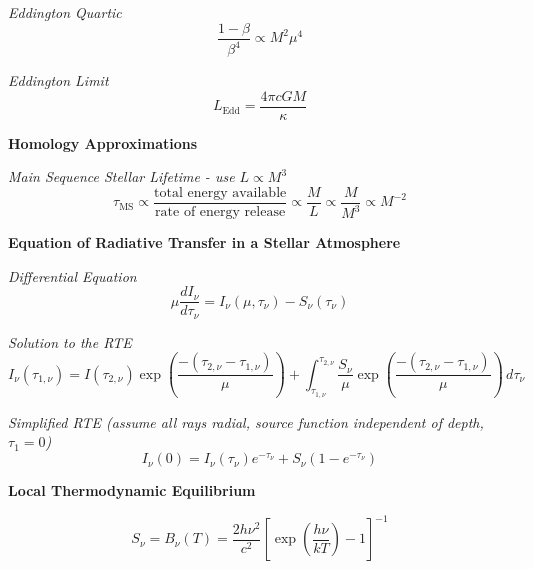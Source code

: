 \documentclass{spy}
\begin{document}
\textit{Eddington Quartic}
\begin{equation}
\frac{1 - \beta}{\beta^4} \propto M^2 \mu^4
\end{equation}

\textit{Eddington Limit}
\begin{equation}
L_\mathrm{Edd} = \frac{4 \pi c G M}{\kappa}
\end{equation}

\textbf {Homology Approximations}

\textit{Main Sequence Stellar Lifetime - use \( L \propto M^3 \)}
\begin{equation}
\tau_\mathrm{MS} \propto \frac{\text{total energy available}}{\text{rate of energy release}} \propto \frac{M}{L} \propto  \frac{M}{M^3} \propto M^{-2}
\end{equation}


\textbf {Equation of Radiative Transfer in a Stellar Atmosphere}

\textit{Differential Equation}
\begin{equation}
\mu \frac{dI_\nu}{d\tau_\nu} = I_\nu (\mu, \tau_\nu) - S_\nu (\tau_\nu)
\end{equation}

\textit{Solution to the RTE}
\begin{equation}
I_\nu(\tau_{1, \nu}) = I(\tau_{2, \nu}) \exp \left( \frac{-(\tau_{2, \nu} - \tau_{1, \nu})}{\mu} \right) + \int_{\tau_{1, \nu}}^{\tau_{2, \nu}} \frac{S_\nu}{\mu} \exp \left( \frac{-(\tau_{2, \nu} - \tau_{1, \nu})}{\mu} \right)  \,d\tau_\nu
\end{equation}

\textit{Simplified RTE (assume all rays radial, source function independent of depth, \(\tau_1 = 0\))}
\begin{equation}
I_\nu(0) = I_\nu (\tau_\nu) e^{-\tau_\nu} + S_\nu (1 - e^ {-\tau_\nu})
\end{equation}


\textbf {Local Thermodynamic Equilibrium}


\begin{equation}
S_\nu = B_\nu(T) = \frac{2 h \nu^2}{c^2} \left[ \exp \left( \frac{h \nu}{kT}  \right) -1 \right]^{-1}
\end{equation}
\end{document}
